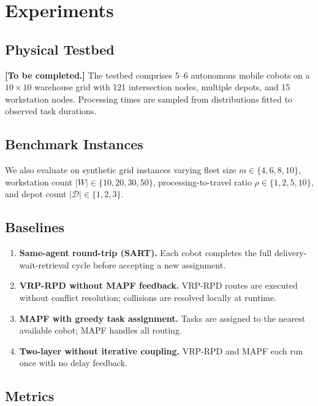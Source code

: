 \documentclass{article}
\begin{document}
\section{Experiments}
\label{sec:experiments}

\subsection{Physical Testbed}

\textbf{[To be completed.]} The testbed comprises 5--6 autonomous mobile cobots
on a $10 \times 10$ warehouse grid with 121 intersection nodes, multiple depots,
and 15 workstation nodes. Processing times are sampled from distributions fitted
to observed task durations.

\subsection{Benchmark Instances}

We also evaluate on synthetic grid instances varying fleet size
$m \in \{4, 6, 8, 10\}$, workstation count $|W| \in \{10, 20, 30, 50\}$,
processing-to-travel ratio $\rho \in \{1, 2, 5, 10\}$, and depot count
$|\mathcal{D}| \in \{1, 2, 3\}$.

\subsection{Baselines}

\begin{enumerate}
    \item \textbf{Same-agent round-trip (SART).} Each cobot completes the full
    delivery-wait-retrieval cycle before accepting a new assignment.
    \item \textbf{VRP-RPD without MAPF feedback.} VRP-RPD routes are executed
    without conflict resolution; collisions are resolved locally at runtime.
    \item \textbf{MAPF with greedy task assignment.} Tasks are assigned to the
    nearest available cobot; MAPF handles all routing.
    \item \textbf{Two-layer without iterative coupling.} VRP-RPD and MAPF each
    run once with no delay feedback.
\end{enumerate}

\subsection{Metrics}
\end{document}
